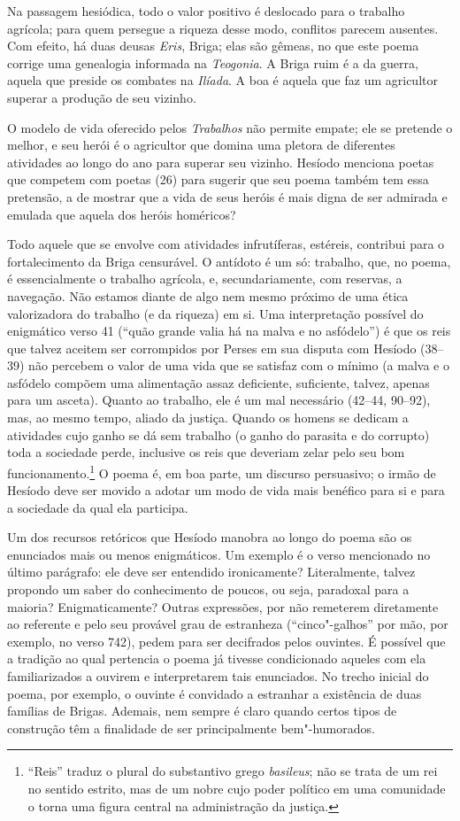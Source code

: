Na passagem hesiódica, todo o valor positivo é deslocado para o trabalho
agrícola; para quem persegue a riqueza desse modo, conflitos parecem
ausentes. Com efeito, há duas deusas \emph{Eris}, Briga; elas são
gêmeas, no que este poema corrige uma genealogia informada na
\emph{Teogonia}. A Briga ruim é a da guerra, aquela que preside os
combates na \emph{Ilíada}. A boa é aquela que faz um agricultor superar
a produção de seu vizinho.

O modelo de vida oferecido pelos \emph{Trabalhos} não permite empate;
ele se pretende o melhor, e seu herói é o agricultor que domina uma
pletora de diferentes atividades ao longo do ano para superar seu
vizinho. Hesíodo menciona poetas que competem com poetas (26) para
sugerir que seu poema também tem essa pretensão, a de mostrar que a vida
de seus heróis é mais digna de ser admirada e emulada que aquela dos
heróis homéricos?

Todo aquele que se envolve com atividades infrutíferas, estéreis,
contribui para o fortalecimento da Briga censurável. O antídoto é um só:
trabalho, que, no poema, é essencialmente o trabalho agrícola, e,
secundariamente, com reservas, a navegação. Não estamos diante de algo
nem mesmo próximo de uma ética valorizadora do trabalho (e da riqueza)
em si. Uma interpretação possível do enigmático verso 41 (``quão grande
valia há na malva e no asfódelo'') é que os reis que talvez aceitem ser
corrompidos por Perses em sua disputa com Hesíodo (38--39) não percebem o
valor de uma vida que se satisfaz com o mínimo (a malva e o asfódelo
compõem uma alimentação assaz deficiente, suficiente, talvez, apenas
para um asceta). Quanto ao trabalho, ele é um mal necessário (42--44,
90--92), mas, ao mesmo tempo, aliado da justiça. Quando os homens se
dedicam a atividades cujo ganho se dá sem trabalho (o ganho do parasita
e do corrupto) toda a sociedade perde, inclusive os reis que deveriam
zelar pelo seu bom funcionamento.\footnote{``Reis'' traduz o plural do
  substantivo grego \emph{basileus}; não se trata de um rei no sentido
  estrito, mas de um nobre cujo poder político em uma comunidade o torna
  uma figura central na administração da justiça.} O poema é, em boa
parte, um discurso persuasivo; o irmão de Hesíodo deve ser movido a
adotar um modo de vida mais benéfico para si e para a sociedade da qual
ela participa.

Um dos recursos retóricos que Hesíodo manobra ao longo do poema são os
enunciados mais ou menos enigmáticos. Um exemplo é o verso mencionado no
último parágrafo: ele deve ser entendido ironicamente? Literalmente,
talvez propondo um saber do conhecimento de poucos, ou seja, paradoxal
para a maioria? Enigmaticamente? Outras expressões, por não remeterem
diretamente ao referente e pelo seu provável grau de estranheza
(``cinco"-galhos'' por mão, por exemplo, no verso 742), pedem para ser
decifrados pelos ouvintes. É possível que a tradição ao qual pertencia o
poema já tivesse condicionado aqueles com ela familiarizados a ouvirem e
interpretarem tais enunciados. No trecho inicial do poema, por exemplo,
o ouvinte é convidado a estranhar a existência de duas famílias de
Brigas. Ademais, nem sempre é claro quando certos tipos de construção
têm a finalidade de ser principalmente bem"-humorados.


